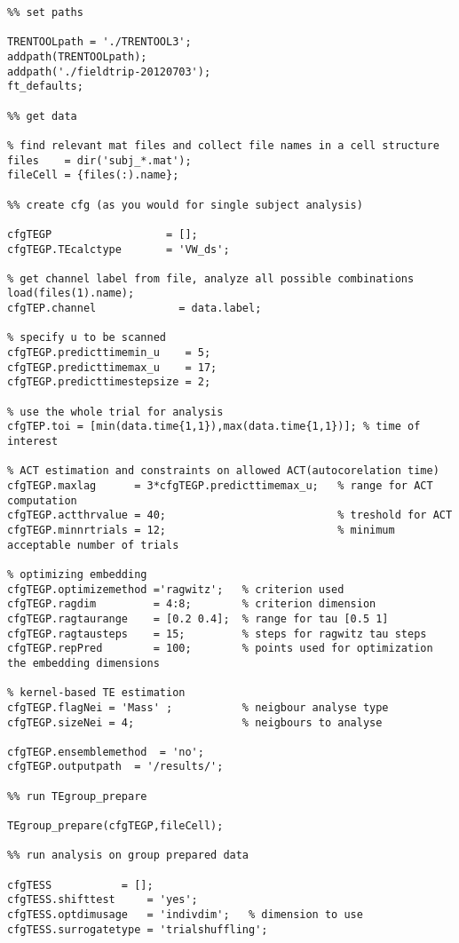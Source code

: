 \begin{lstlisting}
%% set paths

TRENTOOLpath = './TRENTOOL3';
addpath(TRENTOOLpath); 
addpath('./fieldtrip-20120703');
ft_defaults;

%% get data

% find relevant mat files and collect file names in a cell structure
files    = dir('subj_*.mat');
fileCell = {files(:).name};

%% create cfg (as you would for single subject analysis)

cfgTEGP                  = [];
cfgTEGP.TEcalctype       = 'VW_ds'; 

% get channel label from file, analyze all possible combinations
load(files(1).name);
cfgTEP.channel             = data.label;

% specify u to be scanned
cfgTEGP.predicttimemin_u    = 5;
cfgTEGP.predicttimemax_u    = 17;
cfgTEGP.predicttimestepsize = 2;

% use the whole trial for analysis
cfgTEP.toi = [min(data.time{1,1}),max(data.time{1,1})]; % time of interest

% ACT estimation and constraints on allowed ACT(autocorelation time)
cfgTEGP.maxlag      = 3*cfgTEGP.predicttimemax_u;   % range for ACT computation
cfgTEGP.actthrvalue = 40;                           % treshold for ACT 
cfgTEGP.minnrtrials = 12;                           % minimum acceptable number of trials

% optimizing embedding
cfgTEGP.optimizemethod ='ragwitz';   % criterion used
cfgTEGP.ragdim         = 4:8;        % criterion dimension
cfgTEGP.ragtaurange    = [0.2 0.4];  % range for tau [0.5 1]
cfgTEGP.ragtausteps    = 15;         % steps for ragwitz tau steps
cfgTEGP.repPred        = 100;        % points used for optimization the embedding dimensions

% kernel-based TE estimation
cfgTEGP.flagNei = 'Mass' ;           % neigbour analyse type
cfgTEGP.sizeNei = 4;                 % neigbours to analyse

cfgTEGP.ensemblemethod  = 'no';
cfgTEGP.outputpath  = '/results/';

%% run TEgroup_prepare

TEgroup_prepare(cfgTEGP,fileCell);

%% run analysis on group prepared data

cfgTESS		      = [];
cfgTESS.shifttest     = 'yes';
cfgTESS.optdimusage   = 'indivdim';   % dimension to use
cfgTESS.surrogatetype = 'trialshuffling';


\end{lstlisting}
